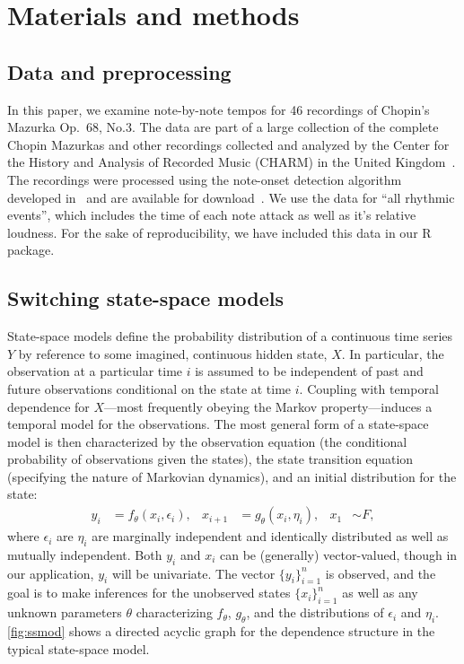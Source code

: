 \documentclass[12pt]{article}
\begin{document}
\section{Materials and methods}
\label{sec:materials-methods}




\subsection{Data and preprocessing}

In this paper, we examine note-by-note tempos for 46 recordings of
Chopin's Mazurka Op.\ 68, No.3. The data are part of a large
collection of the complete Chopin Mazurkas and other recordings
collected and analyzed by the Center for the History and Analysis of
Recorded Music (CHARM) in the United Kingdom~\citep{CHARM-site}. The
recordings were processed using the note-onset detection algorithm
developed in~\citep{Earis2007} and are available for
download~\citep{Earis2009}. We use the data for ``all rhythmic
events'', which includes the time of each note attack as well as it's
relative loudness. For the sake of reproducibility, we have included
this data in our R package.

\subsection{Switching state-space models}

State-space models define the probability distribution of a continuous
time series $Y$ by reference to some imagined, continuous hidden state, $X$. In
particular, the observation at a particular time $i$ is assumed to be
independent of past and future observations conditional on the state
at time $i$. Coupling with temporal dependence for $X$---most
frequently obeying the Markov property---induces a temporal model for
the observations.  The most general form of a state-space model is
then characterized by the 
observation equation (the conditional probability of observations
given the states),
the state transition equation (specifying the nature of Markovian
dynamics), and an initial distribution for the state: 
\begin{equation}
\begin{aligned}
  y_i &= f_\theta(x_i,\epsilon_i), &
  x_{i+1} &= g_\theta(x_i,\eta_i), &
  x_1 &\sim F,
\end{aligned}
\label{eq:ssmod}
\end{equation}
where $\epsilon_i$ are $\eta_i$ are marginally independent and
identically distributed  as well as mutually independent. Both
$y_i$ and $x_i$ can be (generally) vector-valued, though in our
application, $y_i$ will be univariate. The
vector $\{y_i\}_{i=1}^n$ is observed, and the goal is to make
inferences for the unobserved states $\{x_i\}_{i=1}^n$ as well as any
unknown parameters $\theta$ characterizing $f_\theta$, $g_\theta$, and
the distributions of $\epsilon_i$ and $\eta_i$.  \autoref{fig:ssmod}
shows a directed acyclic graph for the dependence structure in the
typical state-space model.
\end{document}
